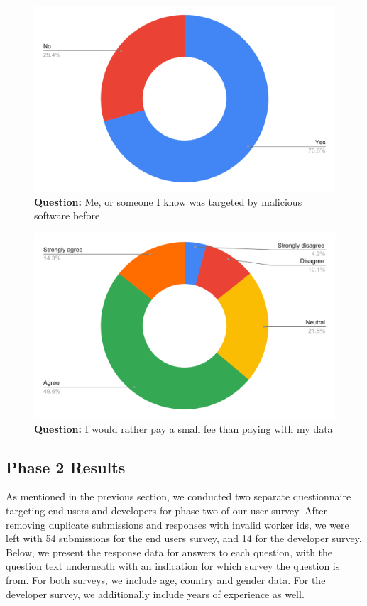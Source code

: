 \begin{figure}[H]
  \centering
  \includegraphics[width=13cm]{thesis/paper/images/p1_q15.pdf}
  \textbf{Question:} Me, or someone I know was targeted by malicious software before
\end{figure}

\begin{figure}[H]
  \centering
  \includegraphics[width=13cm]{thesis/paper/images/p1_q16.pdf}
  \textbf{Question:} I would rather pay a small fee than paying with my data
\end{figure}


\newpage
\subsection{Phase 2 Results}

As mentioned in the previous section, we conducted two separate questionnaire targeting end users and developers for phase two of our user survey. After removing duplicate submissions and responses with invalid worker ids, we were left with 54 submissions for the end users survey, and 14 for the developer survey. Below, we present the response data for answers to each question, with the question text underneath with an indication for which survey the question is from. For both surveys, we include age, country and gender data. For the developer survey, we additionally include years of experience as well.


